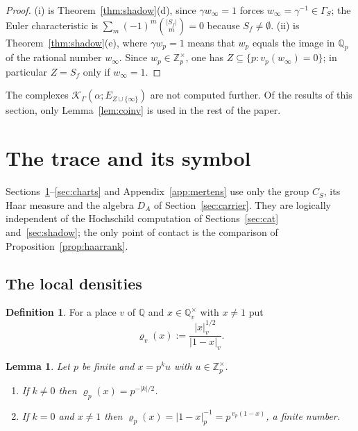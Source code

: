 \documentclass[11pt]{amsart}
\newtheorem{lemma}[theorem]{Lemma}
\theoremstyle{definition}
\newtheorem{definition}[theorem]{Definition}
\theoremstyle{remark}
\newcommand{\Z}{\mathbb Z}
\newcommand{\Q}{\mathbb Q}
\newcommand{\DA}{D_A}
\begin{document}
\begin{proof}
(i) is Theorem~\ref{thm:shadow}(d), since $\gamma w_{\infty}=1$ forces
$w_{\infty}=\gamma^{-1}\in\Gamma_S$; the Euler characteristic is
$\sum_m(-1)^{m}\binom{|S_f|}{m}=0$ because $S_f\ne\emptyset$.  (ii) is
Theorem~\ref{thm:shadow}(e), where $\gamma w_p=1$ means that $w_p$ equals the
image in $\Q_p$ of the rational number $w_{\infty}$.  Since
$w_p\in\Z_p^{\times}$, one has $Z\subseteq\{p:v_p(w_{\infty})=0\}$; in particular
$Z=S_f$ only if $w_{\infty}=1$.
\end{proof}

The complexes $\mathcal K_{\Gamma}(\alpha;E_{Z\cup\{\infty\}})$ are not
computed further.  Of the results of this section, only
Lemma~\ref{lem:coinv} is used in the rest of the paper.

\section{The trace and its symbol}\label{sec:trace}

Sections~\ref{sec:trace}--\ref{sec:charts} and Appendix~\ref{app:mertens} use
only the group $C_S$, its Haar measure and the algebra $\DA$ of
Section~\ref{sec:carrier}.  They are logically independent of the Hochschild
computation of Sections~\ref{sec:cat} and~\ref{sec:shadow}; the only point of
contact is the comparison of Proposition~\ref{prop:haarrank}.

\subsection{The local densities}

\begin{definition}\label{def:tau}
For a place $v$ of $\Q$ and $x\in\Q_v^{\times}$ with $x\ne1$ put
\begin{equation}\label{eq:tau}
\varrho_v(x):=\frac{|x|_v^{1/2}}{|1-x|_v}.
\end{equation}
\end{definition}

\begin{lemma}\label{lem:tau}
Let $p$ be finite and $x=p^{k}u$ with $u\in\Z_p^{\times}$.
\begin{enumerate}
\item[(i)] If $k\ne0$ then $\varrho_p(x)=p^{-|k|/2}$.
\item[(ii)] If $k=0$ and $x\ne1$ then $\varrho_p(x)=|1-x|_p^{-1}=p^{\,v_p(1-x)}$,
a finite number.
\end{enumerate}
\end{lemma}
\end{document}
